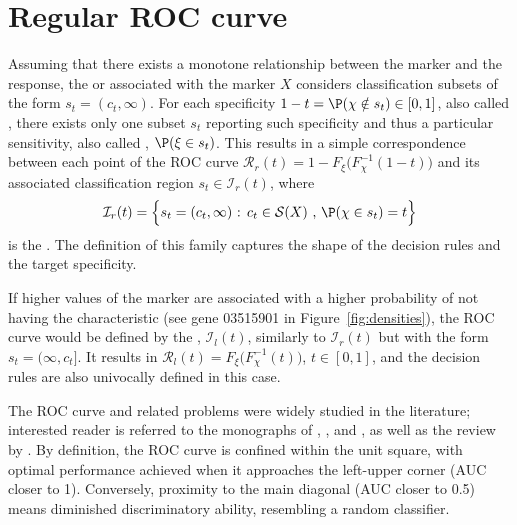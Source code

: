 \newpage


\section{Regular ROC curve} \label{section:regularroc}

Assuming that there exists a monotone relationship between the marker and the response, the  or  associated with the marker $X$ considers classification subsets of the form $s_t=(c_t,\infty)$.
For each specificity $1-t=\P(\chi \notin s_t) \in [0,1]$, also called , there exists only one subset $s_t$ reporting such specificity and thus a particular sensitivity, also called , $\P(\xi \in s_t)$.
This results in a simple correspondence between each point of the ROC curve $\mathcal{R}_r(t) = 1-F_\xi \big(F_\chi^{-1}(1-t)\big)$ and its associated classification region $s_t \in \mathcal{I}_r(t)$, where
$$\mathcal{I}_r(t) = \Big\{ s_t = (c_t, \infty) \mbox{ : } c_t \in \mathcal{S}(X) \mbox{ , } \P(\chi \in s_t) = t \Big\}$$
is the . The definition of this family captures the shape of the decision rules and the target specificity.

If higher values of the marker are associated with a higher probability of not having the characteristic (see gene 03515901 in Figure~\ref{fig:densities}), the ROC curve would be defined by the  \citep{Camblor2017a}, $\mathcal{I}_l(t)$, similarly to $\mathcal{I}_r(t)$ but with the form $s_t = (\infty, c_t]$.
It results in $\mathcal{R}_l(t) = F_\xi \big(F_\chi^{-1}(t) \big)$, $t\in[0,1]$, and the decision rules are also univocally defined in this case.

The ROC curve and related problems were widely studied in the literature; interested reader is referred to the monographs of \citet{Zhou2002}, \citet{Pepe2003a}, and \citet{Nakas2023}, as well as the review by \citet{Inacio2021}.
By definition, the ROC curve is confined within the unit square, with optimal performance achieved when it approaches the left-upper corner (AUC closer to 1). Conversely, proximity to the main diagonal (AUC closer to 0.5) means diminished discriminatory ability, resembling a random classifier.

